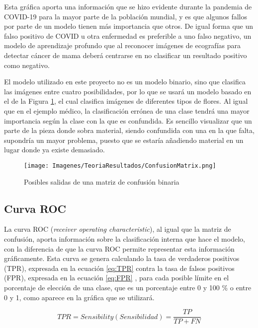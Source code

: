 \documentclass{report}
\begin{document}
Esta gráfica aporta una información que se hizo evidente durante la pandemia de COVID-19 para la mayor parte de la población mundial, y es que algunos fallos por parte de un modelo tienen más importancia que otros. De igual forma que un falso positivo de COVID u otra enfermedad es preferible a uno falso negativo, un modelo de aprendizaje profundo que al reconocer imágenes de ecografías para detectar cáncer de mama deberá centrarse en no clasificar un resultado positivo como negativo.


El modelo utilizado en este proyecto no es un modelo binario, sino que clasifica las imágenes entre cuatro posibilidades, por lo que se usará un modelo basado en el de la Figura \ref{fig:MatrizCofusion}, el cual clasifica imágenes de diferentes tipos de flores. Al igual que en el ejemplo médico, la clasificación errónea de una clase tendrá una mayor importancia según la clase con la que es confundida. Es sencillo visualizar que un parte de la pieza donde sobra material, siendo confundida con una en la que falta, supondría un mayor problema, puesto que se estaría añadiendo material en un lugar donde ya existe demasiado.

\begin{figure}[hbpt]
	\centering
	 \texttt{[image: Imagenes/TeoriaResultados/ConfusionMatrix.png]}
	 \caption{ Posibles salidas de una matriz de confusión binaria \cite{ConfusionMatix} }
	 \label{fig:MatrizCofusion}
\end{figure}


\subsection{Curva ROC}


La curva ROC (\textit{receiver operating characteristic}), al igual que la matriz de confusión, aporta información sobre la clasificación interna que hace el modelo, con la diferencia de que la curva ROC permite representar esta información gráficamente. Esta curva se genera calculando la tasa de verdaderos positivos (TPR), expresada en la ecuación \ref{eq:TPR} contra la tasa de falsos positivos (FPR), expresada en la ecuación \ref{eq:FPR} \cite{ROCCurveTeorica}, para cada posible límite en el porcentaje de elección de una clase, que es un porcentaje entre 0 y 100 \% o entre 0 y 1, como aparece en la gráfica que se utilizará.


\begin{equation}
    TPR = \textit{Sensibility} (Sensibilidad) = \frac{TP}{TP+FN}
    \label{eq:TPR}
\end{equation}
\end{document}
